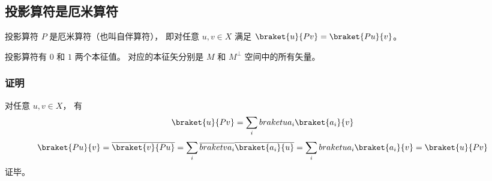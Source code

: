 \subsection{投影算符是厄米算符}
投影算符 $P$ 是厄米算符（也叫自伴算符）， 即对任意 $u, v\in X$ 满足 $\braket{u}{Pv} = \braket{Pu}{v}$。

投影算符有 $0$ 和 $1$ 两个本征值。 对应的本征矢分别是 $M$ 和 $M^\bot$ 空间中的所有矢量。

\subsubsection{证明}
对任意 $u, v\in X$， 有
\begin{equation}
\braket{u}{Pv} = \sum_i \\braket{u}{a_i}\braket{a_i}{v}
\end{equation}
\begin{equation}
\braket{Pu}{v} = \overline {\braket{v}{Pu}} = \sum_i \overline{\\braket{v}{a_i}}\overline{\braket{a_i}{u}} = \sum_i \\braket{u}{a_i}\braket{a_i}{v} = \braket{u}{Pv}
\end{equation}
证毕。
